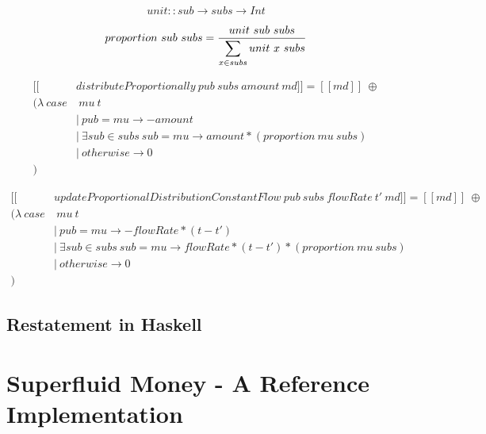 \documentclass[a4paper]{report}
\begin{document}
\begin{equation}
    unit :: sub \rightarrow subs \rightarrow Int
\end{equation}

\begin{equation}
    proportion\ sub\ subs = {{ unit\ sub\ subs } \over { \displaystyle \sum_{x \in subs} unit\ x\ subs }}
\end{equation}

\begin{equation}\label{sem_distributeProportionally}
    \begin{split}
        [\![&distributeProportionally\ pub\ subs\ amount\ md]\!] = [\![md]\!]\ \oplus \\
        (\lambda\ case&\ mu\ t \\
        &|\ pub = mu \rightarrow -amount \\
        &|\ \exists sub \in subs\ { sub = mu } \rightarrow amount * (proportion\ mu\ subs) \\
        &|\ otherwise \rightarrow 0 \\
        )
    \end{split}
\end{equation}

\begin{equation}\label{sem_distributeProportionally}
    \begin{split}
        [\![&updateProportionalDistributionConstantFlow\ pub\ subs\ flowRate\ t'\ md]\!] = [\![md]\!]\ \oplus \\
        (\lambda\ case&\ mu\ t \\
        &|\ pub = mu \rightarrow -flowRate * (t - t') \\
        &|\ \exists sub \in subs\ { sub = mu } \rightarrow flowRate * (t - t') * (proportion\ mu\ subs) \\
        &|\ otherwise \rightarrow 0 \\
        )
    \end{split}
\end{equation}

\section{Restatement in Haskell}

\chapter{Superfluid Money - A Reference Implementation}
\end{document}
